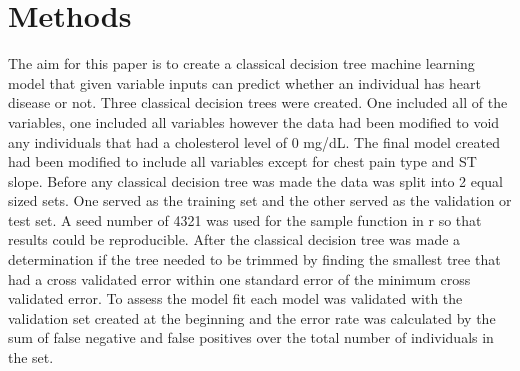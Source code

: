 \documentclass[12pt]{article}
\begin{document}
\section{Methods}
\label{sec:meth}


The aim for this paper is to create a classical decision tree machine learning model that given variable inputs can predict whether an individual has heart disease or not.
Three classical decision trees were created. One included all of the variables, one included all variables however the data had been modified to void any individuals that had a cholesterol level of 0 mg/dL. The final model created had been modified to include all variables except for chest pain type and ST slope.
Before any classical decision tree was made the data was split into 2 equal sized sets. One served as the training set and the other served as the validation or test set. A seed number of 4321 was used for the sample function in r so that results could be reproducible.
After the classical decision tree was made a determination if the tree needed to be trimmed by finding the smallest tree that had a cross validated error within one standard error of the minimum cross validated error.
To assess the model fit each model was validated with the validation set created at the beginning and the error rate was calculated by the sum of false negative and false positives over the total number of individuals in the set.
\end{document}
